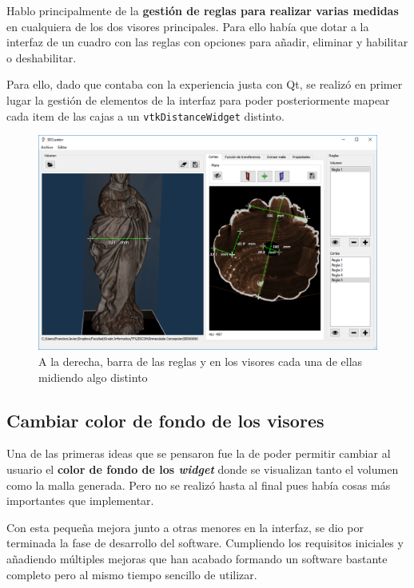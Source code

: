 Hablo principalmente de la \textbf{gestión de reglas para realizar varias medidas} en cualquiera de los dos visores principales. Para ello había que dotar a la interfaz de un cuadro con las reglas con opciones para añadir, eliminar y habilitar o deshabilitar.

Para ello, dado que contaba con la experiencia justa con Qt, se realizó en primer lugar la gestión de elementos de la interfaz para poder posteriormente mapear cada item de las cajas a un \texttt{vtkDistanceWidget} distinto.

\begin{figure}[H]
	\centering
	\includegraphics[width=12.5cm]{imagenes/varias_reglas}
	\caption{A la derecha, barra de las reglas y en los visores cada una de ellas midiendo algo distinto}
	\label{fig:varias_reglas}
\end{figure}

\subsection{Cambiar color de fondo de los visores}

Una de las primeras ideas que se pensaron fue la de poder permitir cambiar al usuario el \textbf{color de fondo de los \textit{widget}} donde se visualizan tanto el volumen como la malla generada. Pero no se realizó hasta al final pues había cosas más importantes que implementar.

Con esta pequeña mejora junto a otras menores en la interfaz, se dio por terminada la fase de desarrollo del software. Cumpliendo los requisitos iniciales y añadiendo múltiples mejoras que han acabado formando un software bastante completo pero al mismo tiempo sencillo de utilizar.
